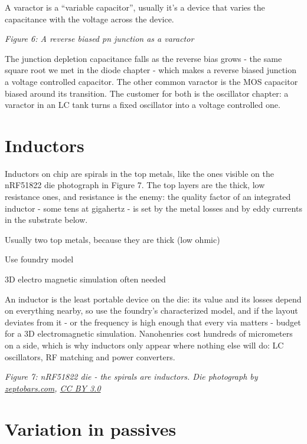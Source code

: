 A varactor is a ``variable capacitor'', usually it's a device that
varies the capacitance with the voltage across the device.


{
\centering
{}
}

\emph{Figure 6: A reverse biased pn junction as a varactor}

The junction depletion capacitance falls as the reverse bias grows - the
same square root we met in the diode chapter - which makes a reverse
biased junction a voltage controlled capacitor. The other common
varactor is the MOS capacitor biased around its transition. The customer
for both is the oscillator chapter: a varactor in an LC tank turns a
fixed oscillator into a voltage controlled one.

\section{Inductors}\label{inductors}

Inductors on chip are spirals in the top metals, like the ones visible
on the nRF51822 die photograph in Figure 7. The top layers are the
thick, low resistance ones, and resistance is the enemy: the quality
factor of an integrated inductor - some tens at gigahertz - is set by
the metal losses and by eddy currents in the substrate below.

Usually two top metals, because they are thick (low ohmic)

Use foundry model

3D electro magnetic simulation often needed

An inductor is the least portable device on the die: its value and its
losses depend on everything nearby, so use the foundry's characterized
model, and if the layout deviates from it - or the frequency is high
enough that every via matters - budget for a 3D electromagnetic
simulation. Nanohenries cost hundreds of micrometers on a side, which is
why inductors only appear where nothing else will do: LC oscillators, RF
matching and power converters.


{
\centering
{}
}

\emph{Figure 7: nRF51822 die - the spirals are inductors. Die photograph
by
\href{https://zeptobars.com/en/read/nRF51822-Bluetooth-LE-SoC-Cortex-M0}{zeptobars.com},
\href{https://creativecommons.org/licenses/by/3.0/}{CC BY 3.0}}

\section{Variation in passives}\label{variation-in-passives}

